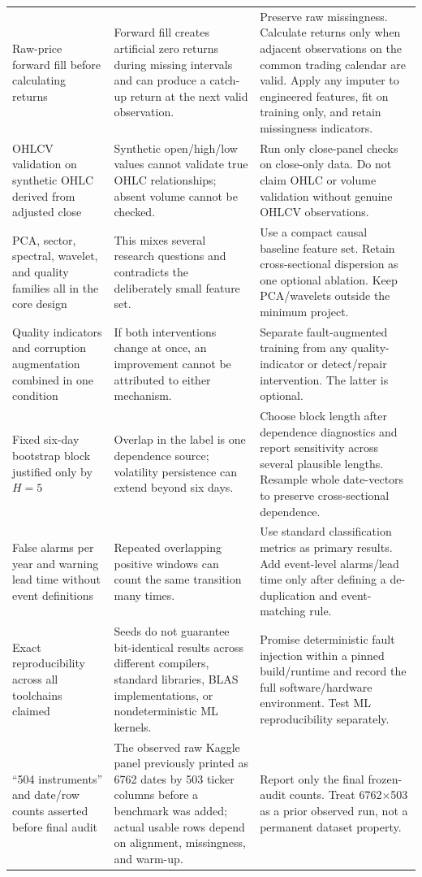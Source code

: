 \documentclass[11pt,a4paper]{article}
\begin{document}
\begin{longtable}{p{3.2cm}p{5.8cm}p{5.7cm}}
\addlinespace
Raw-price forward fill before calculating returns & Forward fill creates artificial zero returns during missing intervals and can produce a catch-up return at the next valid observation. & Preserve raw missingness. Calculate returns only when adjacent observations on the common trading calendar are valid. Apply any imputer to engineered features, fit on training only, and retain missingness indicators.\\
\addlinespace
OHLCV validation on synthetic OHLC derived from adjusted close & Synthetic open/high/low values cannot validate true OHLC relationships; absent volume cannot be checked. & Run only close-panel checks on close-only data. Do not claim OHLC or volume validation without genuine OHLCV observations.\\
\addlinespace
PCA, sector, spectral, wavelet, and quality families all in the core design & This mixes several research questions and contradicts the deliberately small feature set. & Use a compact causal baseline feature set. Retain cross-sectional dispersion as one optional ablation. Keep PCA/wavelets outside the minimum project.\\
\addlinespace
Quality indicators and corruption augmentation combined in one condition & If both interventions change at once, an improvement cannot be attributed to either mechanism. & Separate fault-augmented training from any quality-indicator or detect/repair intervention. The latter is optional.\\
\addlinespace
Fixed six-day bootstrap block justified only by $H=5$ & Overlap in the label is one dependence source; volatility persistence can extend beyond six days. & Choose block length after dependence diagnostics and report sensitivity across several plausible lengths. Resample whole date-vectors to preserve cross-sectional dependence.\\
\addlinespace
False alarms per year and warning lead time without event definitions & Repeated overlapping positive windows can count the same transition many times. & Use standard classification metrics as primary results. Add event-level alarms/lead time only after defining a de-duplication and event-matching rule.\\
\addlinespace
Exact reproducibility across all toolchains claimed & Seeds do not guarantee bit-identical results across different compilers, standard libraries, BLAS implementations, or nondeterministic ML kernels. & Promise deterministic fault injection within a pinned build/runtime and record the full software/hardware environment. Test ML reproducibility separately.\\
\addlinespace
``504 instruments'' and date/row counts asserted before final audit & The observed raw Kaggle panel previously printed as 6762 dates by 503 ticker columns before a benchmark was added; actual usable rows depend on alignment, missingness, and warm-up. & Report only the final frozen-audit counts. Treat 6762$\times$503 as a prior observed run, not a permanent dataset property.\\
\bottomrule
\end{longtable}
\end{document}

